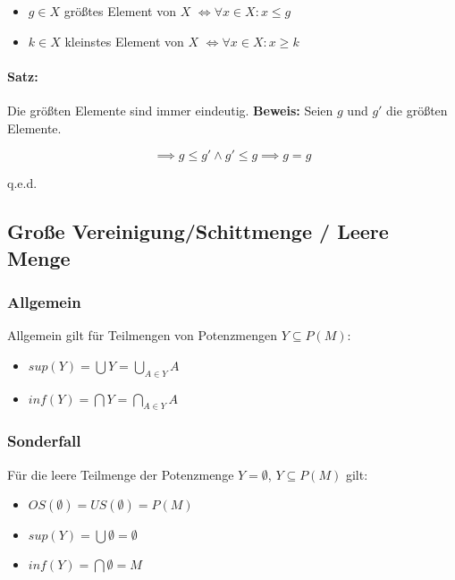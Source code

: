 \documentclass[12pt]{scrreprt}
\newcommand{\theorem}[1]{\paragraph{Satz:} #1\newline}
\newenvironment{proof}
    {\textbf{Beweis:}\newline\indent}
    {\begin{flushright}q.e.d.\end{flushright}}
\begin{document}
                    \begin{itemize}
                        \item $ g \in X $ größtes Element von $ X $ $ \iff \forall x \in X : x \leq g $
                        \item $ k \in X $ kleinstes Element von $ X $ $ \iff \forall x \in X : x \geq k $
                    \end{itemize}

                    \theorem{Die größten Elemente sind immer eindeutig.}
                        \begin{proof}
                            Seien $ g $ und $ g' $ die größten Elemente.

                            \[ \implies g \leq g' \land g' \leq g \implies g = g \]
                        \end{proof}


            \subsection{Große Vereinigung/Schittmenge / Leere Menge}
                \subsubsection{Allgemein}

                    Allgemein gilt für Teilmengen von Potenzmengen $ Y \subseteq P(M) $:
                    \begin{itemize}
                        \item $ sup(Y) = \bigcup Y = \bigcup\limits _ { A \in Y } A $
                        \item $ inf(Y) = \bigcap Y = \bigcap\limits _ { A \in Y } A $
                    \end{itemize}


                \subsubsection{Sonderfall}

                    Für die leere Teilmenge der Potenzmenge $ Y = \emptyset $, $ Y \subseteq P(M) $ gilt:
                    \begin{itemize}
                        \item $ OS(\emptyset) = US(\emptyset) = P(M) $
                        \item $ sup(Y) = \bigcup \emptyset = \emptyset $
                        \item $ inf(Y) = \bigcap \emptyset = M $
                    \end{itemize}
\end{document}
